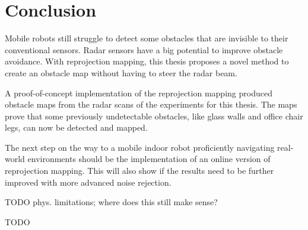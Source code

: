 \section{Conclusion}\label{conclusion-1}

Mobile robots still struggle to detect some obstacles that are invisible
to their conventional sensors. Radar sensors have a big potential to
improve obstacle avoidance. With reprojection mapping, this thesis
proposes a novel method to create an obstacle map without having to
steer the radar beam.

A proof-of-concept implementation of the reprojection mapping produced
obstacle maps from the radar scans of the experiments for this thesis.
The maps prove that some previously undetectable obstacles, like glass
walls and office chair legs, can now be detected and mapped.

The next step on the way to a mobile indoor robot proficiently
navigating real-world environments should be the implementation of an
online version of reprojection mapping. This will also show if the
results need to be further improved with more advanced noise rejection.

TODO phys. limitations; where does this still make sense?

TODO
